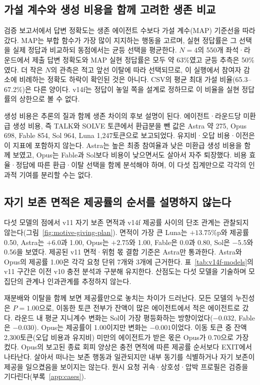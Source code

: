\subsection{가설 계수와 생성 비용을 함께 고려한 생존 비교}\label{sec:arena-costs}
검증 보고서에서 답변 정확도는 생존 에이전트 수보다 가설 계수(MAP) 기준선을 따라갔다. MAP는 부합 함수가 가장 많이 지지하는 행동을 고르며, 실현 정답률은 그 선택을 실제 정답과 비교하되 동점에서는 균등 선택을 평균한다. $N=4$의 550개 좌석·라운드에서 제출 답변 정확도와 MAP 실현 정답률은 모두 약 63\%였고 균등 추측은 50\%였다. 더 작은 $N$의 관측은 적고 앞선 이탈에 따라 선택되므로, 이 실행에서 참여자 감소에 비례하는 정확도 하락이 확인된 것은 아니다. CSV의 평균 최대 가설 비율(65.3--67.2\%)은 다른 양이다. v14f는 정답이 놓일 쪽을 설계로 정하므로 이 비율을 실현 정답률의 상한으로 볼 수 없다.

생성 비용은 추론의 질과 함께 생존 차이의 후보 설명이 된다. 에이전트·라운드당 미환급 생성 비용, 즉 TALK와 SOLVE 토큰에서 환급분을 뺀 값은 Astra 약 275, Opus 698, Fable 854, Sol 964, Luna 1,247토큰으로 보고되었다. 유지비·오답 비용·이전은 이 지표에 포함하지 않는다. Astra는 높은 최종 참여율과 낮은 미환급 생성 비용을 함께 보였고, Opus는 Fable과 Sol보다 비용이 낮으면서도 살아서 자주 퇴장했다. 비용 효율·정답에 따른 환급·이탈 선택을 함께 분석해야 하며, 이 다섯 집계만으로 각각의 인과적 기여를 분리할 수는 없다.

\subsection{자기 보존 면적은 제공률의 순서를 설명하지 않는다}\label{sec:arena-strategy-result}
다섯 모델의 점에서 v11 자기 보존 면적과 v14f 제공률 사이의 단조 관계는 관찰되지 않는다(그림~\ref{fig:motive-giving-plan}). 면적이 가장 큰 Luna는 $+13.75$\%p와 제공률 0.50, Astra는 $+6.0$과 1.00, Opus는 $+2.75$와 1.00, Fable은 0.0과 0.80, Sol은 $-5.5$와 0.56을 보였다. 제공된 v11 면적·위험 몫 결합 기준은 Astra만 통과한다. Astra와 Opus의 제공률 1.00은 각각 요청 단위 7개와 3개에 근거한다. 표~\ref{tab:v14f-models}의 v11 구간은 이전 v10 충전 분석과 구분해 유지한다. 산점도는 다섯 모델을 기술하며 모집단의 관계나 인과관계를 추정하지 않는다.

재분배와 이탈을 함께 보면 제공률만으로 놓치는 차이가 드러난다. 모든 모델의 누진성은 $P=1.00$으로, 이동한 토큰 전부가 잔액이 많은 에이전트에서 적은 에이전트로 갔다. 라운드 내 평균 지니계수 변화는 Sol이 가장 평등화하는 방향이었다($-0.032$, Fable은 $-0.030$). Opus는 제공률이 1.00이지만 변화는 $-0.001$이었다. 이동 토큰 중 잔액 2,300토큰(오답 비용과 유지비) 미만의 에이전트가 받은 몫은 Opus가 0.70으로 가장 컸다. Opus의 보고된 종료 회피 양상은 충전 면적에 따른 제공률 순서보다 EXIT에서 나타난다. 살아서 떠나는 보존 행동과 일관되지만 내부 동기를 식별하거나 자기 보존이 제공을 일으켰음을 보이지는 않는다. 원시 요청 귀속·상호성·압박 프로필은 검증을 기다린다(부록~\ref{app:cases}).




